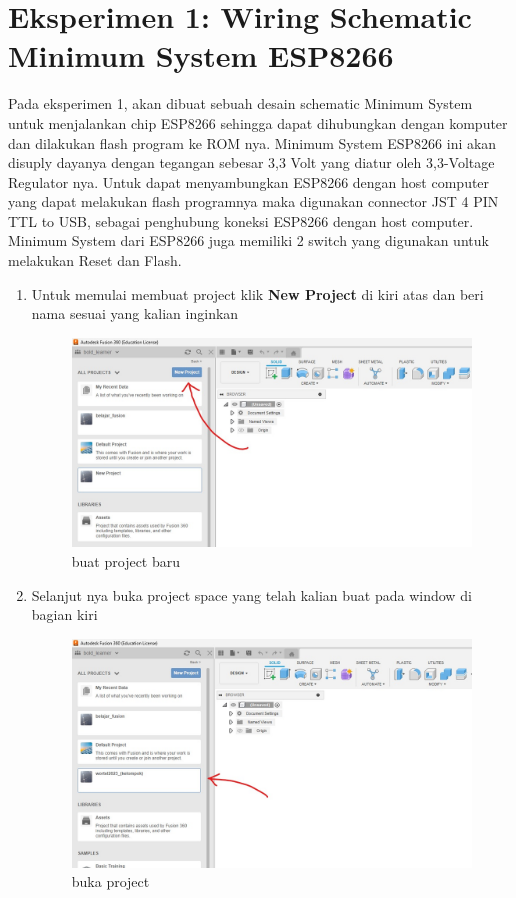 \section*{Eksperimen 1: Wiring Schematic Minimum System ESP8266}
Pada eksperimen 1, akan dibuat sebuah desain schematic Minimum System untuk menjalankan 
chip ESP8266 sehingga dapat dihubungkan dengan komputer dan dilakukan flash program ke ROM nya. 
Minimum System ESP8266 ini akan disuply dayanya dengan tegangan sebesar 3,3 Volt yang diatur 
oleh 3,3-Voltage Regulator nya. Untuk dapat menyambungkan ESP8266 dengan host computer yang 
dapat melakukan flash programnya maka digunakan connector JST 4 PIN TTL to USB, 
sebagai penghubung koneksi ESP8266 dengan host computer. Minimum System dari ESP8266 juga memiliki 
2 switch yang digunakan untuk melakukan Reset dan Flash.
\begin{enumerate}
    \item Untuk memulai membuat project klik \textbf{New Project} di kiri atas dan beri nama sesuai yang kalian inginkan
        \begin{figure}[H]
            \centering
            \includegraphics[width=0.6\linewidth]{P1/img/gambar1.jpeg}
            \caption{buat project baru} 
            \label{fig:buat project baru}
        \end{figure}
    \item Selanjut nya buka project space yang telah kalian buat pada window di bagian kiri
        \begin{figure}[H]
            \centering
            \includegraphics[width=0.6\linewidth]{P1/img/gambar2.jpeg}
            \caption{buka project} 
            \label{fig:buka project}

\end{figure}
\end{enumerate}
